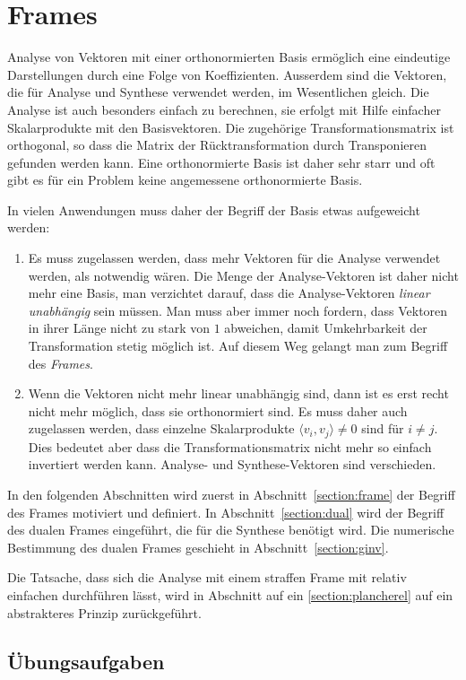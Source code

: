 %
%
%
\chapter{Frames
\label{chapter:frames}}
Analyse von Vektoren mit einer orthonormierten Basis ermöglich eine
eindeutige Darstellungen durch eine Folge von Koeffizienten. 
Ausserdem sind die Vektoren, die für Analyse und Synthese verwendet
werden, im Wesentlichen gleich.
Die Analyse ist auch besonders einfach zu berechnen,
sie erfolgt mit Hilfe einfacher Skalarprodukte mit den Basisvektoren.
Die zugehörige Transformationsmatrix ist orthogonal, so dass die
Matrix der Rücktransformation durch Transponieren gefunden werden kann.
Eine orthonormierte Basis ist daher sehr starr und oft gibt es für ein
Problem keine angemessene orthonormierte Basis.

In vielen Anwendungen muss daher der Begriff der Basis etwas aufgeweicht
werden:
\begin{enumerate}
\item
Es muss zugelassen werden, dass mehr Vektoren für die Analyse verwendet
werden, als notwendig wären.
Die Menge der Analyse-Vektoren ist daher nicht mehr eine Basis, man
verzichtet darauf, dass die Analyse-Vektoren {\em linear unabhängig} sein
müssen.
Man muss aber immer noch fordern, dass Vektoren in ihrer Länge nicht
zu stark von $1$ abweichen,
damit Umkehrbarkeit der Transformation stetig möglich ist.
Auf diesem Weg gelangt man zum Begriff des {\em Frames}.
\item
Wenn die Vektoren nicht mehr linear unabhängig sind, dann ist es erst
recht nicht mehr möglich, dass sie orthonormiert sind.
Es muss daher auch zugelassen werden, dass einzelne Skalarprodukte 
$\langle v_i,v_j\rangle\ne 0$ sind für $i\ne j$.
Dies bedeutet aber dass die Transformationsmatrix nicht mehr so einfach
invertiert werden kann.
Analyse- und Synthese-Vektoren sind verschieden.
\end{enumerate}
In den folgenden Abschnitten wird zuerst in Abschnitt~\ref{section:frame}
der Begriff des Frames motiviert und definiert.
In Abschnitt~\ref{section:dual} wird der Begriff des dualen Frames
eingeführt, die für die Synthese benötigt wird.
Die numerische Bestimmung des dualen Frames geschieht in
Abschnitt~\ref{section:ginv}.

Die Tatsache, dass sich die Analyse mit einem straffen Frame mit relativ
einfachen durchführen lässt, wird in Abschnitt auf ein \ref{section:plancherel}
auf ein abstrakteres Prinzip zurückgeführt.






\section*{Übungsaufgaben}







